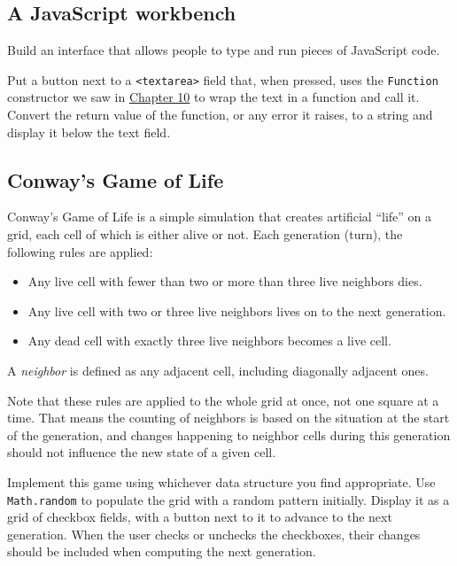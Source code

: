 \subsection{A JavaScript workbench}

Build an interface that allows people to type and run pieces of JavaScript code.

Put a button next to a \lstinline`<textarea>` field that, when pressed, uses the \lstinline`Function` constructor we saw in \hyperref[modules.eval]{Chapter 10} to wrap the text in a function and call it. Convert the return value of the function, or any error it raises, to a string and display it below the text field.

\subsection{Conway's Game of Life}

Conway's Game of Life is a simple simulation that creates artificial ``life'' on a grid, each cell of which is either alive or not. Each generation (turn), the following rules are applied:

\begin{itemize}
\item 

Any live cell with fewer than two or more than three live neighbors dies.
\item 

Any live cell with two or three live neighbors lives on to the next generation.
\item 

Any dead cell with exactly three live neighbors becomes a live cell.
\end{itemize}

A \emph{neighbor} is defined as any adjacent cell, including diagonally adjacent ones.

Note that these rules are applied to the whole grid at once, not one square at a time. That means the counting of neighbors is based on the situation at the start of the generation, and changes happening to neighbor cells during this generation should not influence the new state of a given cell.

Implement this game using whichever data structure you find appropriate. Use \lstinline`Math.random` to populate the grid with a random pattern initially. Display it as a grid of checkbox fields, with a button next to it to advance to the next generation. When the user checks or unchecks the checkboxes, their changes should be included when computing the next generation.

